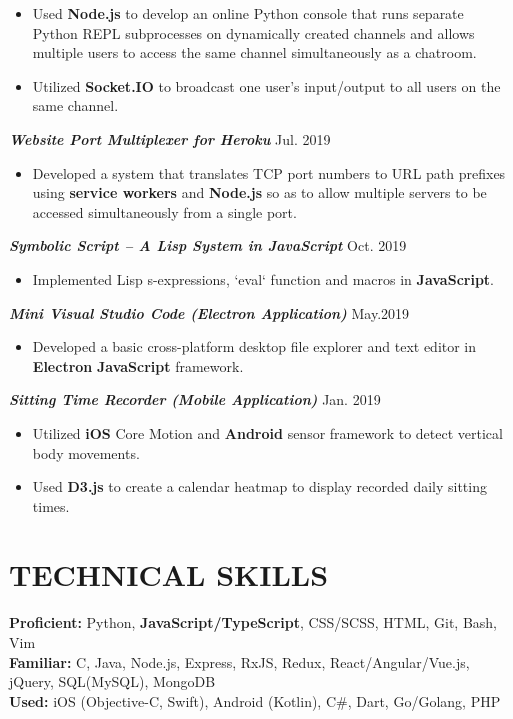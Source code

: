 \documentclass[10pt]{article}
\begin{document}
\begin{itemize}[leftmargin=15pt, noitemsep, topsep=0pt]
\item Used \textbf{Node.js} to develop an online Python console that runs separate Python REPL subprocesses on dynamically created channels and allows multiple users to access the same channel simultaneously as a chatroom.
\item Utilized \textbf{Socket.IO} to broadcast one user’s input/output to all users on the same channel.
\end{itemize}
\vspace{0.5em}
%
\textbf{\itshape Website Port Multiplexer for Heroku}  \hfill {Jul. 2019}
\begin{itemize}[leftmargin=15pt, noitemsep, topsep=0pt]
\item Developed a system that translates TCP port numbers to URL path prefixes using \textbf{service workers} and \textbf{Node.js} so as to allow multiple servers to be accessed simultaneously from a single port. 
\end{itemize}
\vspace{0.2em}
%
\textbf{\itshape Symbolic Script – A Lisp System in JavaScript}  \hfill {Oct. 2019}
\begin{itemize}[leftmargin=15pt, noitemsep, topsep=0pt]
\item Implemented Lisp s-expressions, `eval` function and macros in \textbf{JavaScript}.
\end{itemize}
\vspace{0.2em}
%
\textbf{\itshape Mini Visual Studio Code (Electron Application)}  \hfill {May.2019}
\begin{itemize}[leftmargin=15pt, noitemsep, topsep=0pt]
\item Developed a basic cross-platform desktop file explorer and text editor in \textbf{Electron} \textbf{JavaScript} framework.
\end{itemize}
\vspace{0.2em}
%
\textbf{\itshape Sitting Time Recorder (Mobile Application)}  \hfill {Jan. 2019}
\begin{itemize}[leftmargin=15pt, noitemsep, topsep=0pt]
\item Utilized \textbf{iOS} Core Motion and \textbf{Android} sensor framework to detect vertical body movements.
\item Used \textbf{D3.js} to create a calendar heatmap to display recorded daily sitting times.
\end{itemize}
%
\vspace{-0.5em}
\section*{TECHNICAL SKILLS}
\textbf{Proficient:} Python, \textbf{JavaScript/TypeScript}, CSS/SCSS, HTML, Git, Bash, Vim\\
\textbf{Familiar:} C, Java,  Node.js, Express, RxJS, Redux, React/Angular/Vue.js, jQuery, SQL(MySQL), MongoDB\\
\textbf{Used:} iOS (Objective-C, Swift), Android (Kotlin), C\#, Dart, Go/Golang, PHP
\end{document}
